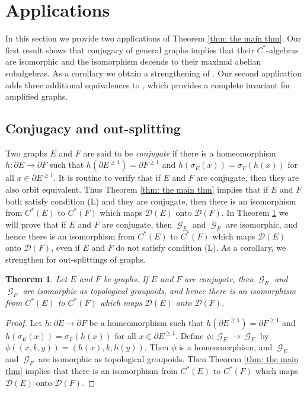 \documentclass[12pt, a4paper]{amsart}
\numberwithin{equation}{section}
\newtheorem{thm}{Theorem}[section]
\theoremstyle{definition}
\theoremstyle{remark}
\begin{document}
\section{Applications}\label{sec: applications}

In this section we provide two applications of Theorem \ref{thm: the main thm}. Our first result shows that conjugacy of general graphs implies that their $C^*$-algebras are isomorphic and the isomorphism decends to their maximal abelian subalgebras. As a corollary we obtain a strengthening of \cite[Theorem 3.2]{BP}. Our second application adds three additional equivalences to \cite[Theorem 1.1]{ERS}, which provides a complete invariant for amplified graphs.

\subsection{Conjugacy and out-splitting}\label{subsec: conj and out-sp}

Two graphs $E$ and $F$ are said to be \emph{conjugate} if there is a 
homeomorphism $h:\partial E\to\partial F$ such that $h(\partial E^{\ge 
1})=\partial F^{\ge 1}$ and $h(\sigma_E(x))=\sigma_F(h(x))$ for all 
$x\in\partial E^{\ge 1}$. It is routine to verify that if $E$ and $F$ are 
conjugate, then they are also orbit equivalent. Thus Theorem \ref{thm: the 
main thm} implies that if $E$ and $F$ both satisfy condition (L) and they are 
conjugate, then there is an isomorphism from $C^*(E)$ to $C^*(F)$ which maps 
$\mathcal{D}(E)$ onto $\mathcal{D}(F)$. In Theorem \ref{thm:conj} we will 
prove that if $E$ and $F$ are conjugate, then ${\operatorname{\mathcal{G}}}_E$ and ${\operatorname{\mathcal{G}}}_F$ are 
isomorphic, and hence there is an isomorphism from $C^*(E)$ to $C^*(F)$ which 
maps $\mathcal{D}(E)$ onto $\mathcal{D}(F)$, even if $E$ and $F$ do not 
satisfy condition (L). As a corollary, we strengthen \cite[Theorem 3.2]{BP} 
for out-splittings of graphs.

\begin{thm}\label{thm:conj}
	Let $E$ and $F$ be graphs. If $E$ and $F$ are conjugate, then ${\operatorname{\mathcal{G}}}_E$ and ${\operatorname{\mathcal{G}}}_F$ are isomorphic as topological groupoids, and hence there is an isomorphism from $C^*(E)$ to $C^*(F)$ which maps $\mathcal{D}(E)$ onto $\mathcal{D}(F)$.
\end{thm}

\begin{proof}
	Let $h:\partial E\to\partial F$ be a homeomorphism such that $h(\partial E^{\ge 1})=\partial F^{\ge 1}$ and $h(\sigma_E(x))=\sigma_F(h(x))$ for all $x\in\partial E^{\ge 1}$. Define $\phi:{\operatorname{\mathcal{G}}}_E\to{\operatorname{\mathcal{G}}}_F$ by $\phi((x,k,y))=(h(x),k,h(y))$. Then $\phi$ is a homeomorphism, and ${\operatorname{\mathcal{G}}}_E$ and ${\operatorname{\mathcal{G}}}_F$ are isomorphic as topological groupoids. Then Theorem \ref{thm: the main thm} implies that there is an isomorphism from $C^*(E)$ to $C^*(F)$ which maps $\mathcal{D}(E)$ onto $\mathcal{D}(F)$.
\end{proof}
\end{document}
